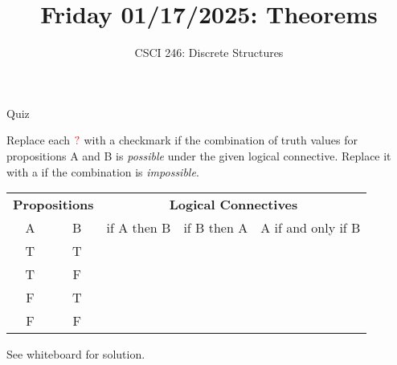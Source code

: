 \documentclass[10pt]{beamer}
\begin{document}






\title{Friday 01/17/2025: Theorems}
\author{CSCI 246: Discrete Structures}
\date{}

\begin{frame}
    \titlepage 
\end{frame}



\begin{frame}{Quiz}

Replace each $\color{red}{?} \color{black}$ with a checkmark \greencheck if the combination of truth values for propositions A and B is \textit{possible} under the given logical connective.  Replace it with a \redx if the combination is \textit{impossible}.

\begin{table}
\centering
\begin{tabular}{cc|ccc}
\multicolumn{2}{c}{\textbf{Propositions}} & \multicolumn{3}{c}{\textbf{Logical Connectives}} \\
A  & B & if A then B & if B then A & A if and only if B \\
\hline 
T & T & \red{?} & \red{?} & \red{?}\\
T & F &\red{?}  & \red{?} & \red{?} \\
F & T & \red{?} & \red{?} & \red{?} \\
F & F & \red{?} &\red{?}  & \red{?}
\end{tabular}
\end{table}
\vfill \vfill \vfill 
\pause 
\alertstar \alert{See whiteboard for solution.}
\end{frame}
\end{document}
